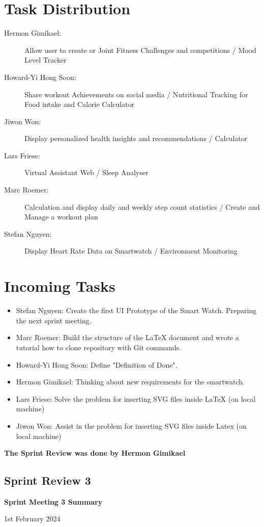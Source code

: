 \documentclass{article}
\begin{document}
\section*{Task Distribution}
\begin{description}
    \item[Hermon Gimikael:] Allow user to create or Joint Fitness Challenges and competitions / Mood Level Tracker
    \item[Howard-Yi Hong Soon:] Share workout Achievements on social media / Nutritional Tracking for Food intake and Calorie Calculator
    \item[Jiwon Won:] Display personalized health insights and recommendations / Calculator
    \item[Lars Friese:] Virtual Assistant Web / Sleep Analyser
    \item[Marc Roemer:] Calculation and display daily and weekly step count statistics / Create and Manage a workout plan
    \item[Stefan Nguyen:] Display Heart Rate Data on Smartwatch / Environment Monitoring
\end{description}

\section*{Incoming Tasks}
\begin{itemize}
	\item Stefan Nguyen: Create the first UI Prototype of the Smart Watch. Preparing the next sprint meeting.
    \item Marc Roemer: Build the structure of the LaTeX document and wrote a tutorial how to clone repository with Git commands.
    \item Howard-Yi Hong Soon: Define "Definition of Done".
    \item Hermon Gimikael: Thinking about new requirements for the smartwatch.
    \item Lars Friese: Solve the problem for inserting SVG files inside LaTeX (on local machine)
    \item Jiwon Won: Assist in the problem for inserting SVG files inside Latex (on local machine)
\end{itemize}
\noindent
\textbf{The Sprint Review was done by Hermon Gimikael}
\newpage

\subsection{Sprint Review 3}
\begin{center}
    {\Large \textbf{Sprint Meeting 3 Summary}}
    
    \vspace{0.5cm}
    
    {\large 1st February 2024}
\end{center}
\end{document}
